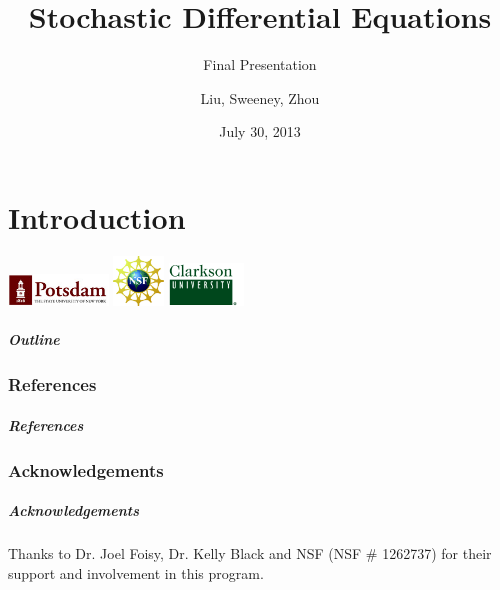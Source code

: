 \documentclass{beamer}   %
\begin{document}
\part{Introduction}


\title{Stochastic Differential Equations}
\subtitle{Final Presentation}

\author{Liu, Sweeney, Zhou}
\date{July 30, 2013}

\begin{frame}[plain]
  \titlepage
  \begin{center}
  \includegraphics[width=0.2\textwidth]{SUNYPotsdam}
  \includegraphics[width=0.1\textwidth]{nsf_logobig}
  \includegraphics[width=0.15\textwidth]{clarksonGreen}
\end{center}
\end{frame}

\begin{frame}
  \frametitle{Outline}
  \vspace{-5mm}
\end{frame}











\section{References}

\begin{frame}
    \frametitle{References}
\end{frame}






\section{Acknowledgements}

\begin{frame}
    \frametitle{Acknowledgements}
	Thanks to Dr. Joel Foisy, Dr. Kelly Black and NSF (NSF \# 1262737) for their support and involvement in this program.
\end{frame}
\end{document}
